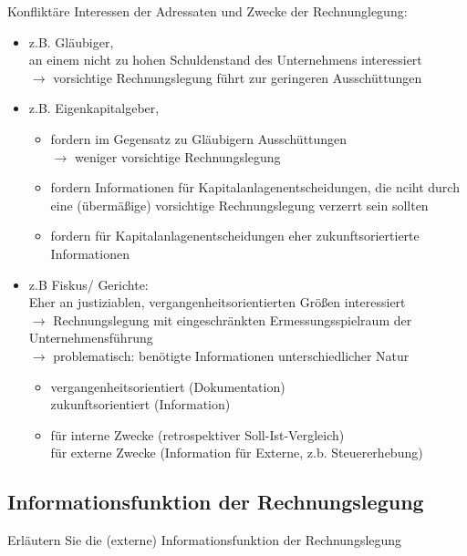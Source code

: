 \documentclass[paper=a4, fontsize=11pt]{scrartcl}
\numberwithin{equation}{section}
\numberwithin{figure}{section}
\numberwithin{table}{section}
\begin{document}
Konfliktäre Interessen der Adressaten und Zwecke der Rechnunglegung: \\
\begin{itemize}
\item z.B. Gläubiger, \\
an einem nicht zu hohen Schuldenstand des Unternehmens interessiert \\
$\rightarrow$ vorsichtige Rechnungslegung führt zur geringeren Ausschüttungen

\item z.B. Eigenkapitalgeber,
  \begin{itemize}
  \item fordern im Gegensatz zu Gläubigern Ausschüttungen \\
$\rightarrow$ weniger vorsichtige Rechnungslegung
  \item fordern Informationen für Kapitalanlagenentscheidungen, die nciht durch eine (übermäßige) vorsichtige Rechnungslegung verzerrt sein sollten
  \item fordern für Kapitalanlagenentscheidungen eher zukunftsoriertierte Informationen
\end{itemize}

\item z.B Fiskus/ Gerichte: \\
Eher an justiziablen, vergangenheitsorientierten Größen interessiert \\
$\rightarrow$ Rechnungslegung mit eingeschränkten Ermessungsspielraum der Unternehmensführung \\
$\rightarrow$ problematisch:  benötigte Informationen unterschiedlicher Natur \\
  \begin{itemize}
  \item vergangenheitsorientiert (Dokumentation) \\
zukunftsorientiert (Information)
  \item für interne Zwecke (retrospektiver Soll-Ist-Vergleich) \\
für externe Zwecke (Information für Externe, z.b. Steuererhebung)
\end{itemize}
\end{itemize}
\subsection{Informationsfunktion der Rechnungslegung}
Erläutern Sie die (externe) Informationsfunktion der Rechnungslegung \\
\end{document}
